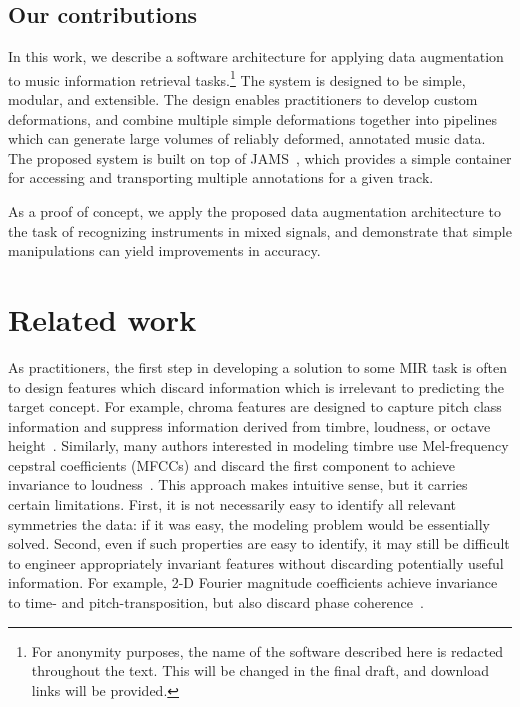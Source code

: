 \documentclass{article}
\begin{document}
\subsection{Our contributions}
In this work, we describe a software architecture for applying data augmentation to music
information retrieval tasks.\footnote{For anonymity purposes, the name of the software
    described here is redacted throughout the text.  This will be changed in the final
draft, and download links will be provided.}
The system is designed to be simple, modular, and
extensible. The design enables practitioners to develop custom deformations, and combine
multiple simple deformations together into pipelines which can generate large volumes of
reliably deformed, annotated music data.  The proposed system is built on top of
JAMS~\cite{humphreyjams}, which provides a simple container for accessing and
transporting multiple annotations for a given track.

As a proof of concept, we apply the proposed data augmentation architecture to the
task of recognizing instruments in mixed signals, and demonstrate that simple
manipulations can yield improvements in accuracy.

\section{Related work}

As practitioners, the first step in developing a solution to some MIR task is often to
design features which discard information which is irrelevant to predicting the target
concept.  For example, chroma features are designed to capture pitch class information
and suppress information derived from timbre, loudness, or octave
height~\cite{muller2011chroma}.  Similarly, many authors interested in modeling timbre
use Mel-frequency cepstral coefficients (MFCCs) and discard the first component to
achieve invariance to loudness~\cite{pampalk2004matlab}.
This approach makes intuitive sense, but it carries certain limitations.
First, it is not necessarily easy to identify all relevant symmetries the
data: if it was easy, the modeling problem would be essentially solved.
Second, even if such properties are easy to identify, it may still be difficult to
engineer appropriately invariant features without discarding potentially useful
information.  For example, 2-D Fourier magnitude coefficients achieve invariance to
time- and pitch-transposition, but also discard phase coherence~\cite{ellis2012large}.
\end{document}
